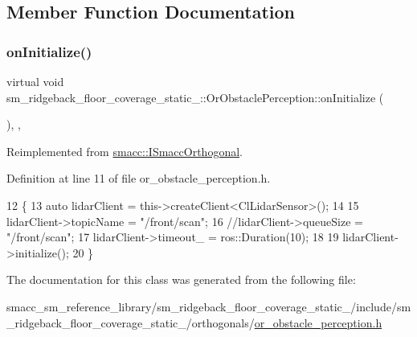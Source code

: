\subsection{Member Function Documentation}
\mbox{\label{classsm__ridgeback__floor__coverage__static__1_1_1OrObstaclePerception_a4a3e73bb6260305589266eacd773a584}} 
\subsubsection{\texorpdfstring{on\+Initialize()}{onInitialize()}}
{\footnotesize\ttfamily virtual void sm\+\_\+ridgeback\+\_\+floor\+\_\+coverage\+\_\+static\+\_\+::\+Or\+Obstacle\+Perception\+::on\+Initialize (\begin{DoxyParamCaption}{ }\end{DoxyParamCaption})\hspace{0.3cm}{\ttfamily [inline]}, {\ttfamily [override]}, {\ttfamily [virtual]}}



Reimplemented from \hyperlink{classsmacc_1_1ISmaccOrthogonal_a6bb31c620cb64dd7b8417f8705c79c7a}{smacc\+::\+I\+Smacc\+Orthogonal}.



Definition at line 11 of file or\+\_\+obstacle\+\_\+perception.\+h.


\begin{DoxyCode}
12     \{
13         \textcolor{keyword}{auto} lidarClient = this->createClient<ClLidarSensor>();
14 
15         lidarClient->topicName = \textcolor{stringliteral}{"/front/scan"};
16         \textcolor{comment}{//lidarClient->queueSize = "/front/scan";}
17         lidarClient->timeout\_ = ros::Duration(10);
18 
19         lidarClient->initialize();
20     \}
\end{DoxyCode}


The documentation for this class was generated from the following file\+:\begin{DoxyCompactItemize}
\item 
smacc\+\_\+sm\+\_\+reference\+\_\+library/sm\+\_\+ridgeback\+\_\+floor\+\_\+coverage\+\_\+static\+\_/include/sm\+\_\+ridgeback\+\_\+floor\+\_\+coverage\+\_\+static\+\_/orthogonals/\hyperlink{sm__ridgeback__floor__coverage__static__1_2include_2sm__ridgeback__floor__coverage__static__1_2o33a958b8f92508413a9167a8a8d214fd}{or\+\_\+obstacle\+\_\+perception.\+h}\end{DoxyCompactItemize}
